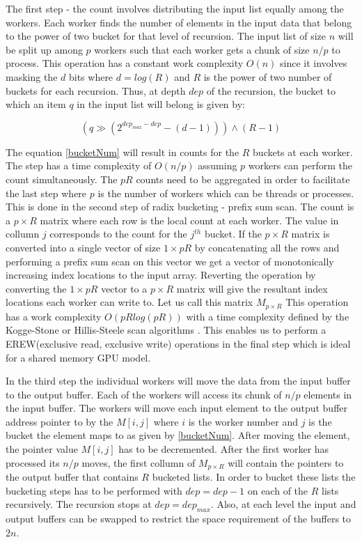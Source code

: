 \documentclass[conference]{IEEEtran}
\begin{document}
The first step - the count involves distributing the input list equally among the workers. Each worker finds the number of elements in the input data that belong to the power of two bucket for that level of recursion. The input list of size $n$ will be split up among $p$ workers such that each worker gets a chunk of size $n/p$ to process. This operation has a constant work complexity $O(n)$ since it involves masking the $d$ bits where $d = log(R)$ and $R$ is the power of two number of buckets for each recursion. Thus, at depth $dep$ of the recursion, the bucket to which an item $q$ in the input list will belong is given by:

\begin{equation}
(q \gg (2^{dep_{max}-dep}-(d-1)))\land(R-1) \label{bucketNum}
\end{equation}

The equation \ref{bucketNum} will result in counts for the $R$ buckets at each worker. The step has a time complexity of $O(n/p)$ assuming $p$ workers can perform the count simultaneously. The $pR$ counts need to be aggregated in order to facilitate the last step where $p$ is the number of workers which can be threads or processes. This is done in the second step of radix bucketing - prefix sum scan. The count is a $p \times R$ matrix where each row is the local count at each worker. The value in collumn $j$ corresponds to the count for the $j^{th}$ bucket. If the $p\times R$ matrix is converted into a single vector of size $1\times pR$ by concatenating all the rows and performing a prefix sum scan on this vector we get a vector of monotonically increasing index locations to the input array. Reverting the operation by converting the $1\times pR$ vector to a $p \times R$ matrix will give the resultant index locations each worker can write to. Let us call this matrix $M_{p\times R}$ This operation has a work complexity $O(pRlog(pR))$ with a time complexity defined by the Kogge-Stone or Hillis-Steele scan algorithms \cite{b14}. This enables us to perform a EREW(exclusive read, exclusive write) operations in the final step which is ideal for a shared memory GPU model.

In the third step the individual workers will move the data from the input buffer to the output buffer. Each of the workers will access its chunk of $n/p$ elements in the input buffer. The workers will move each input element to the output buffer address pointer to by the $M[i, j]$ where $i$ is the worker number and $j$ is the bucket the element maps to as given by \ref{bucketNum}. After moving the element, the pointer value $M[i, j]$ has to be decremented. After the first worker has processed its $n/p$ moves, the first collumn of $M_{p\times R}$ will contain the pointers to the output buffer that contains $R$ bucketed lists. In order to bucket these lists the bucketing steps has to be performed with $dep=dep-1$ on each of the $R$ lists recursively. The recursion stops at $dep = dep_{max}$. Also, at each level the input and output buffers can be swapped to restrict the space requirement of the buffers to $2n$.
\end{document}
